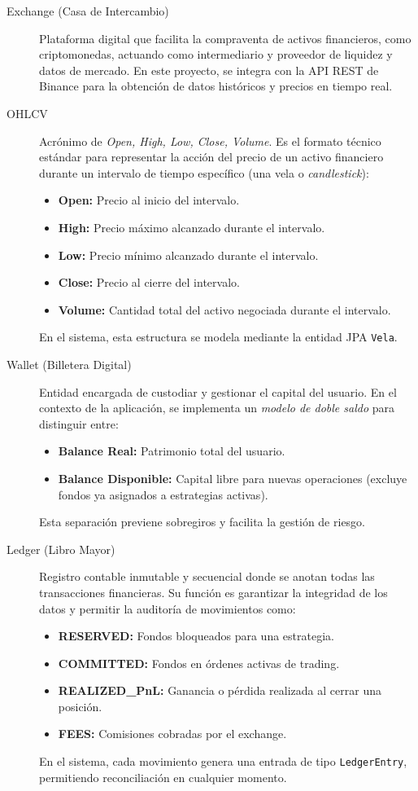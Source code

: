 \begin{description}
    \item[Exchange (Casa de Intercambio)] Plataforma digital que facilita la compraventa de activos financieros, como criptomonedas, actuando como intermediario y proveedor de liquidez y datos de mercado. En este proyecto, se integra con la API REST de Binance para la obtención de datos históricos y precios en tiempo real.

    \item[OHLCV] Acrónimo de \textit{Open, High, Low, Close, Volume}. Es el formato técnico estándar para representar la acción del precio de un activo financiero durante un intervalo de tiempo específico (una vela o \textit{candlestick}):
    \begin{itemize}
        \item \textbf{Open:} Precio al inicio del intervalo.
        \item \textbf{High:} Precio máximo alcanzado durante el intervalo.
        \item \textbf{Low:} Precio mínimo alcanzado durante el intervalo.
        \item \textbf{Close:} Precio al cierre del intervalo.
        \item \textbf{Volume:} Cantidad total del activo negociada durante el intervalo.
    \end{itemize}
    En el sistema, esta estructura se modela mediante la entidad JPA \texttt{Vela}.

    \item[Wallet (Billetera Digital)] Entidad encargada de custodiar y gestionar el capital del usuario. En el contexto de la aplicación, se implementa un \textit{modelo de doble saldo} para distinguir entre:
    \begin{itemize}
        \item \textbf{Balance Real:} Patrimonio total del usuario.
        \item \textbf{Balance Disponible:} Capital libre para nuevas operaciones (excluye fondos ya asignados a estrategias activas).
    \end{itemize}
    Esta separación previene sobregiros y facilita la gestión de riesgo.

    \item[Ledger (Libro Mayor)] Registro contable inmutable y secuencial donde se anotan todas las transacciones financieras. Su función es garantizar la integridad de los datos y permitir la auditoría de movimientos como:
    \begin{itemize}
        \item \textbf{RESERVED:} Fondos bloqueados para una estrategia.
        \item \textbf{COMMITTED:} Fondos en órdenes activas de trading.
        \item \textbf{REALIZED\_PnL:} Ganancia o pérdida realizada al cerrar una posición.
        \item \textbf{FEES:} Comisiones cobradas por el exchange.
    \end{itemize}
    En el sistema, cada movimiento genera una entrada de tipo \texttt{LedgerEntry}, permitiendo reconciliación en cualquier momento.


\end{description}
